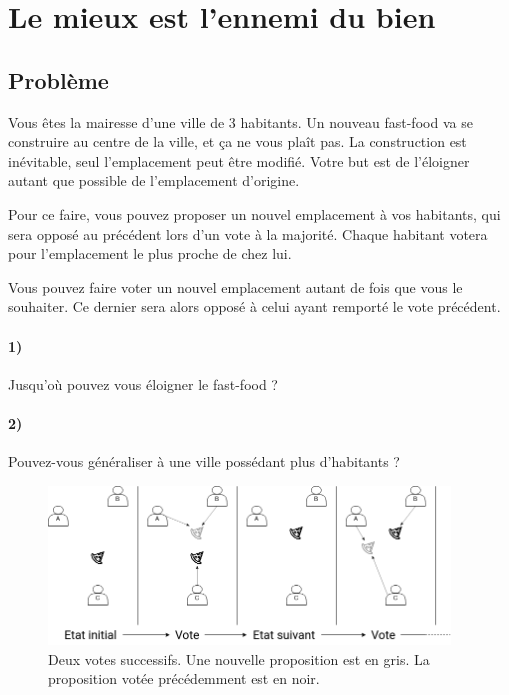 \documentclass[a4paper,10pt,oneside]{article}
\begin{document}
\section{Le mieux est l'ennemi du bien}

\subsection{Problème}

Vous êtes la mairesse d'une ville de 3 habitants.
Un nouveau fast-food va se construire au centre de la ville, et ça ne vous plaît pas.
La construction est inévitable, seul l'emplacement peut être modifié.
Votre but est de l'éloigner autant que possible de l'emplacement d'origine.

Pour ce faire, vous pouvez proposer un nouvel emplacement à vos habitants, qui sera opposé au précédent lors d'un vote à la majorité.
Chaque habitant votera pour l'emplacement le plus proche de chez lui.

Vous pouvez faire voter un nouvel emplacement autant de fois que vous le souhaiter.
Ce dernier sera alors opposé à celui ayant remporté le vote précédent.


\paragraph*{1)} 
Jusqu'où pouvez vous éloigner le fast-food ?

\paragraph*{2)} 
Pouvez-vous généraliser à une ville possédant plus d'habitants ?


\begin{figure}[!h]
  \centering
  \includegraphics*[width=0.95\textwidth]{figures/democracy.png}
  \caption{Deux votes successifs. Une nouvelle proposition est en gris. La proposition votée précédemment est en noir.}
\end{figure}
\end{document}
